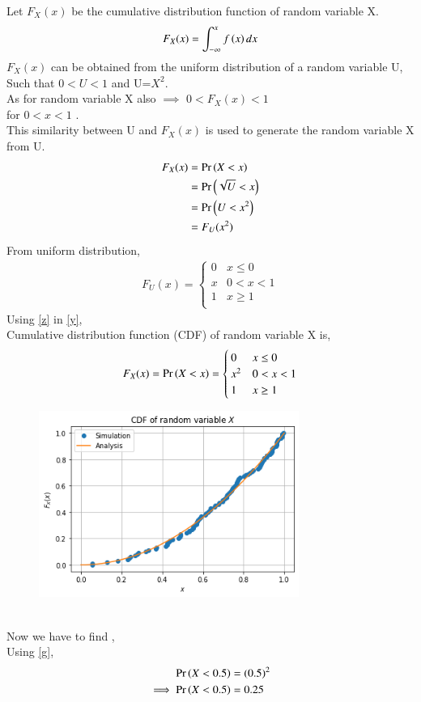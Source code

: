 \documentclass[journal,12pt,twocolumn]{IEEEtran}
\begin{document}
Let $F_X(x)$ be the cumulative distribution function of random variable X.
\begin{align}
    F_X(x)=\int_{-\infty}^x f\left(x\right) dx\label{x}
\end{align}
\newpage 
$F_X(x)$ can be obtained from the uniform distribution of a random variable U,\\ Such that $0<U<1$ and U=$X^2$. 
\\As for random variable X also $\implies$ $0 < F_X(x) < 1\, $\\for $0<x<1$ .
\\This similarity between U and $F_X(x)$ is used to generate the random variable X from U.
\begin{align}
    F_X(x)&= \Pr\left(X<x\right)\\
    &=\Pr\left(\sqrt{U}<x\right)\\
    &=\Pr\left(U<x^2\right)\\
    &=F_U(x^2)\label{y}
\end{align}
From uniform distribution,
\begin{align}
    F_U(x)=
    \begin{cases}
0 & x\leq0\\
x & 0<x<1
\\
1 & x\geq1\label{z}\\
\end{cases}
\end{align}
Using \eqref{z} in \eqref{y},
\\Cumulative distribution function (CDF) of random variable X is,
\begin{align}
F_X(x)= \Pr\left(X<x\right)
= 
\begin{cases}
0 & x\leq0\\
x^2 & 0<x<1
\\
1 & x\geq1\label{g}\\
\end{cases}
\end{align}
\begin{figure}[htp]
    \centering
    \includegraphics[width=8.5cm]{assign2_1.png}
\end{figure}
\\Now we have to find ,\\
Using  \eqref{g},
\begin{align}
    \Pr\left(X<0.5\right) &= (0.5)^2\\
  \implies \Pr\left(X<0.5\right) &= 0.25
\end{align}
\end{document}
